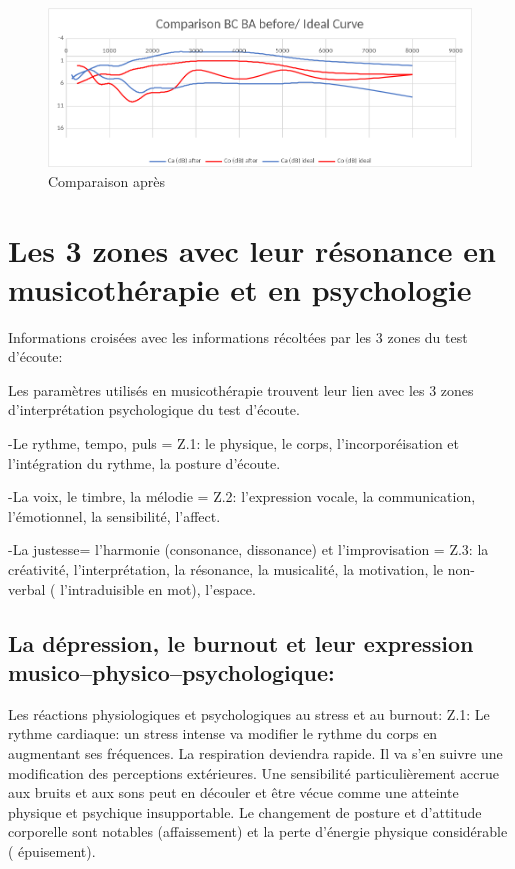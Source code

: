  \begin{figure}[bh]
 	\centering
 	\includegraphics[width=0.7\linewidth]{images/clinique/comparison_bc_ba_after_vs_ideal_curve_meyer.png}
 	\caption{Comparaison après}
 	\label{fig:comparisonbcbaaftervsidealcurvemeyer}
 \end{figure}
 
 
\section{Les 3 zones avec leur résonance en musicothérapie et en
  psychologie}


	Informations croisées avec les informations récoltées par les 3 
          zones du test d'écoute:
          
Les paramètres utilisés en musicothérapie trouvent leur lien avec les
3 zones d'interprétation psychologique du test d'écoute.

-Le rythme, tempo, puls  =  Z.1: le physique, le corps, l'incorporéisation et
l'intégration du rythme,
la posture d'écoute.

-La voix, le timbre, la mélodie =  Z.2:  l'expression vocale, la communication,
l'émotionnel, la sensibilité, l'affect.

-La justesse= l'harmonie (consonance, dissonance) et l'improvisation = Z.3:  la créativité, l'interprétation, la
résonance, la musicalité, la motivation, le non-verbal (
l'intraduisible en mot), l'espace.


\subsection{La dépression, le burnout et leur expression musico--physico--psychologique:}

Les réactions physiologiques et psychologiques au stress et au burnout:
  Z.1: Le rythme cardiaque: un stress intense va modifier le rythme
  du corps en augmentant ses fréquences. La respiration deviendra
  rapide. Il va s'en suivre une modification des perceptions
  extérieures. Une sensibilité particulièrement accrue aux bruits et
  aux sons peut en découler et être vécue comme une
  atteinte physique et psychique insupportable.
  Le changement de posture et d'attitude corporelle sont
notables (affaissement) et la perte d'énergie physique considérable ( épuisement).

